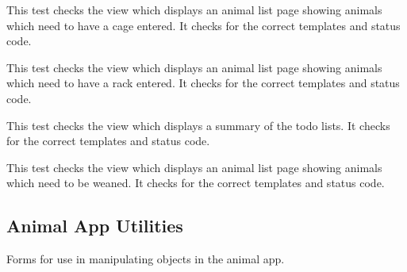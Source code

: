\documentclass[letterpaper,10pt,english]{sphinxmanual}
\begin{document}
\begin{fulllineitems}
\begin{fulllineitems}
\label{animals:mousedb.animal.tests.ToDoViewTests.test_no_cage_list}
This test checks the view which displays an animal list page showing animals which need to have a cage entered.  It checks for the correct templates and status code.

\end{fulllineitems}


\begin{fulllineitems}
\label{animals:mousedb.animal.tests.ToDoViewTests.test_no_rack_list}
This test checks the view which displays an animal list page showing animals which need to have a rack entered.  It checks for the correct templates and status code.

\end{fulllineitems}


\begin{fulllineitems}
\label{animals:mousedb.animal.tests.ToDoViewTests.test_todo_home}
This test checks the view which displays a summary of the todo lists.  It checks for the correct templates and status code.

\end{fulllineitems}


\begin{fulllineitems}
\label{animals:mousedb.animal.tests.ToDoViewTests.test_wean_list}
This test checks the view which displays an animal list page showing animals which need to be weaned.  It checks for the correct templates and status code.

\end{fulllineitems}


\end{fulllineitems}



\subsection{Animal App Utilities}
\label{animals:animal-app-utilities}\label{animals:module-mousedb.animal.forms}
Forms for use in manipulating objects in the animal app.
\end{document}
